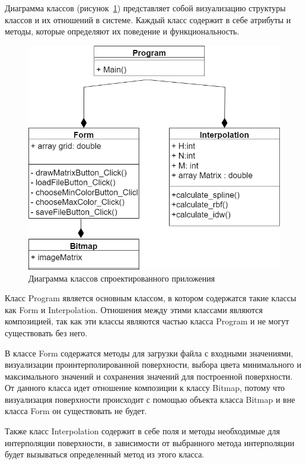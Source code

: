 Диаграмма классов (рисунок~\ref{fig:12}) представляет собой визуализацию структуры классов и их отношений в системе. Каждый класс содержит в себе атрибуты и методы, которые определяют их поведение и функциональность. 

\begin{figure}[h!]
    \center
    \includegraphics[scale=0.6]{images/diagram class.png}
    \caption{Диаграмма классов спроектированного приложения}
    \label{fig:12}
\end{figure}

Класс Program является основным классом, в котором содержатся такие классы как Form и Interpolation. Отношения между этими классами являются композицией, так как эти классы являются частью класса Program и не могут существовать без него. 

В классе Form содержатся методы для загрузки файла с входными значениями, визуализации проинтерполированной поверхности, выбора цвета минимального и максимального значений и сохранения значений для построенной поверхности. От данного класса идет отношение композиции к классу Bitmap, потому что визуализация поверхности происходит с помощью объекта класса Bitmap и вне класса Form он существовать не будет.

Также класс Interpolation содержит в себе поля и методы необходимые для интерполяции поверхности, в зависимости от выбранного метода интерполяции будет вызываться определенный метод из этого класса. 

